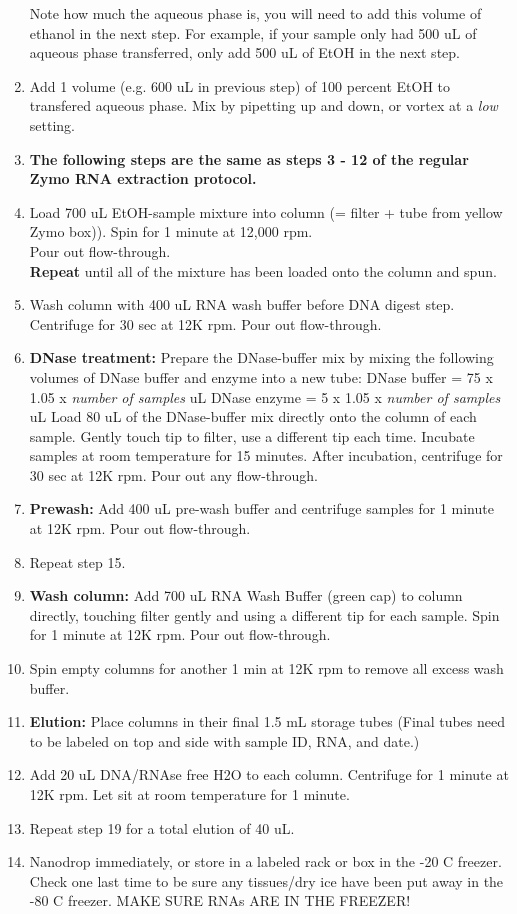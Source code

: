 \documentclass[a4paper,12pt,twoside]{book}
\begin{document}
\begin{enumerate}
	\subitem Note how much the aqueous phase is, you will need to add this volume of ethanol in the next step. For example, if your sample only had 500 uL of aqueous phase transferred, only add 500 uL of EtOH in the next step. 
	\item Add 1 volume (e.g. 600  uL in previous step) of 100 percent EtOH to transfered aqueous phase. Mix by pipetting up and down, or vortex at a {\em low} setting. 
	\item[] {\bf The following steps are the same as steps 3 - 12 of the regular Zymo RNA extraction protocol.}
	\item Load 700 uL EtOH-sample mixture into column (= filter + tube from yellow Zymo box)). Spin for 1 minute at 12,000 rpm.  \\
	Pour out flow-through. \\
	{\bf Repeat} until all of the mixture has been loaded onto the column and spun. 
	\item Wash column with 400 uL RNA wash buffer before DNA digest step. Centrifuge for 30 sec at 12K rpm. Pour out flow-through.
	\item {\bf DNase treatment:} 
	\subitem Prepare the DNase-buffer mix by mixing the following volumes of DNase buffer and enzyme into a new tube: 
	\subitem DNase buffer = 75 x 1.05 x {\em number of samples}  uL 
	\subitem DNase enzyme =  5 x 1.05 x {\em number of samples} uL 
	\subitem Load 80 uL of the DNase-buffer mix directly onto the column of each sample. Gently touch tip to filter, use a different tip each time. 
	\subitem Incubate samples at room temperature for 15 minutes.  
	\subitem After incubation, centrifuge for 30 sec at 12K rpm. Pour out any flow-through. 
	\item {\bf Prewash:} Add 400 uL pre-wash buffer and centrifuge samples for 1 minute at 12K rpm. Pour out flow-through.
	\item Repeat step 15. 
	\item {\bf Wash column:} Add  700 uL RNA Wash Buffer (green cap) to column directly, touching filter gently and using a different tip for each sample.  Spin for 1 minute at 12K rpm.  Pour out flow-through. 
	\item Spin empty columns for another 1 min at 12K rpm to remove all excess wash buffer. 
	\item{\bf Elution:} Place columns in their final 1.5 mL storage tubes 
	(Final tubes need to be labeled on top and side with sample ID, RNA, and date.) 
	\item[] Add 20 uL DNA/RNAse free H2O to each column.  Centrifuge for 1 minute at 12K rpm.  Let sit at room temperature for 1 minute. 
	\item Repeat step 19 for a total elution of 40 uL. 
	\item Nanodrop immediately, or store in a labeled rack or box in the -20 C freezer. 
	\subitem Check one last time to be sure any tissues/dry ice have been put away in the -80 C freezer. MAKE SURE RNAs ARE IN THE FREEZER! 

\end{enumerate}
\end{document}
